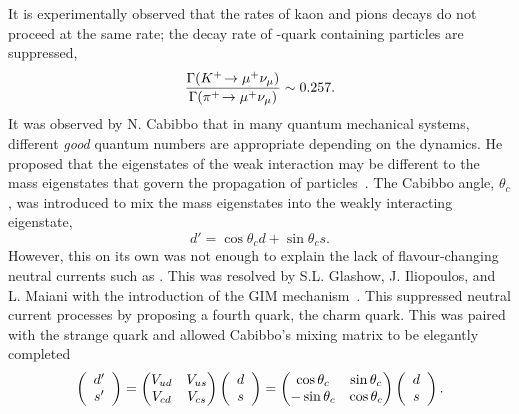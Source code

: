 It is experimentally observed that the rates of kaon and pions decays do not proceed at the same rate; the decay rate of \squark-quark containing particles are suppressed,
\begin{equation}
\frac{\Gamma({{K}^+}\!\rightarrow {\ensuremath{\mu^+}}{\ensuremath{{\nu}_\mu}})}{\Gamma({{\pi}^+}\!\rightarrow {\ensuremath{\mu^+}}{\ensuremath{{\nu}_\mu}})}\sim 0.257.
\end{equation}
It was observed by N. Cabibbo that in many quantum mechanical systems, different \emph{good} quantum numbers are appropriate depending on the dynamics. He proposed that the eigenstates of the weak interaction may be different to the mass eigenstates that govern the propagation of particles~\cite{PhysRevLett.10.531}.
The Cabibbo angle, $\theta_{c}$, was introduced to mix the mass eigenstates into the weakly interacting eigenstate,
\begin{equation}
d' = \cos{\theta_{c}}d + \sin{\theta_{c}}s.
\end{equation}
However, this on its own was not enough to explain the lack of flavour-changing neutral currents such as \decay{\Kz}{\mup\mun}. This was resolved by S.L. Glashow, J. Iliopoulos, and L. Maiani with the introduction of the GIM mechanism~\cite{PhysRevD.2.1285}. This suppressed neutral current processes by proposing a fourth quark, the charm quark. This was paired with the strange quark and allowed  Cabibbo's mixing matrix to be elegantly completed
\begin{equation}
\left( \begin{array}{c} d' \\ s'  \end{array} \right) = \begin{pmatrix} {\ensuremath{V_{{u}{d}}}} & {V_{{u}{s}}} \\ {V_{{c}{d}}} & {V_{{c}{s}}} \end{pmatrix} \left( \begin{array}{c} d \\ s \end{array} \right)= \begin{pmatrix} \cos{\theta_{c}} & \sin{\theta_{c}} \\ -\sin{\theta_{c}} & \cos{\theta_{c}} \end{pmatrix} \left( \begin{array}{c} d \\ s \end{array} \right).
\end{equation}

